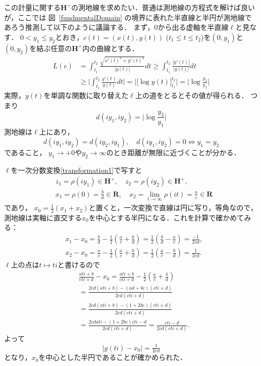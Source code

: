 この計量に関する$\mathbf H^{+}$の測地線を求めたい．普通は測地線の方程式を解けば良いが，ここでは
図~\ref{fundmentalDomain} の境界に表れた半直線と半円が測地線であろう推測して以下のように議論する．
まず，$0$から出る虚軸を半直線$\ell$と見なす．
$0<y_1\le y_2$とおき，$c(t)=(x(t),y(t))$ ($t_1\le t\le t_2$)を$(0,y_1)$と
$(0,y_2)$を結ぶ任意の$\mathbf H^{+}$内の曲線とする．
\[
\begin{split}
	L(c)
	&=
	\int_{t_1}^{t_2} \frac {\sqrt{x'(t)^2 +y'(t)^2}}{|y(t)|}dt
	\ge \int_{t_1}^{t_2} \frac {|y'(t)|}{|y(t)|}dt\\
	&\ge \biggl|\int_{t_1}^{t_2} \frac {y'(t)}{y(t)}dt\biggr|
	=\bigl|\bigl[\log y(t) \bigr]_{t_1}^{t_2} \bigr|
	=\bigl|\log \frac{ y_2}{ y_1}\bigr|
\end{split}
\]
実際，$y(t)$を単調な関数に取り替えた$\ell$上の道をとるとその値が得られる．
つまり
\[
	d(iy_1,iy_2)=\bigl|\log \frac{ y_2}{ y_1}\bigr|
\]
測地線は$\ell$上にあり，
\[
	d(iy_1,iy_2)=d(iy_2,iy_1),\quad
	d(iy_1,iy_2)=0 \Leftrightarrow y_1=y_2
\]
であること，
$y_1\to +0$や$y_2\to \infty$のとき距離が無限に近づくことが分かる．

$\ell$を一次分数変換\eqref{transformation1}で写すと
\[
\begin{split}
	&z_1=\rho(iy_1)\in \mathbf H^{+},\quad z_2=\rho(iy_2)\in \mathbf H^{+},\\
	&x_1=\rho (0)=\frac{b}{d}\in \mathbf R,\quad
	x_2=\lim_{t\to \infty}\rho (it)=\frac{a}{c}\in \mathbf R
\end{split}
\]
であり，
$
	x_0=\frac12(x_1+x_2)
$と置くと，一次変換で直線は円に写り，等角なので，測地線は実軸に直交する$x_0$を中心とする半円になる．これを計算で確かめてみる：
\[
\begin{split}
	&x_1-x_0
	=\frac{b}{d}-\frac12(\frac ac+\frac bd)
	=\frac12(\frac bd-\frac ac)
	= \frac{-1}{2cd},\\
	&x_2-x_0
	=\frac{a}{c}-\frac12(\frac ac+\frac bd)
	=\frac12(\frac ac-\frac bd)
	= \frac1{2cd}.
\end{split}
\]
$\ell$上の点は$t\mapsto ti $と書けるので
\[
\begin{split}
	&\frac{ati +b}{cti +d} -x_0
	=\frac{ati +b}{cti +d} -\frac12(\frac ac+\frac bd)\\
	&=
	\frac{2cd(ati +b)-(ad+bc)(cti +d)}{2cd(cti +d)}\\
	&=
	\frac{2cd(ati +b)-(1+2bc)(cti +d)}{2cd(cti +d)}\\
	&=
	\frac{2cdati -(1+2bc)cti -d}{2cd(cti +d)}
	=
	\frac{cti - d}{2cd(cti +d)}.
\end{split}
\]
よって
\[
	|g(ti)-x_0| = \tfrac1{2cd}
\]
となり，$x_0$を中心とした半円であることが確かめられた．
\emptyline

